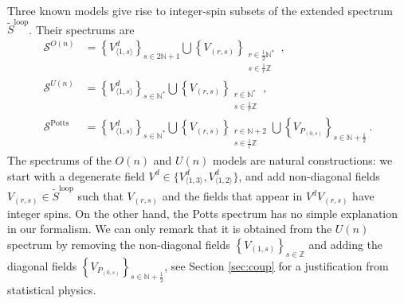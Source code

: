 \documentclass[12pt, a4paper]{article}
\theoremstyle{break}
\begin{document}
Three known models give rise to integer-spin subsets of the extended spectrum $\widetilde{S}^\text{loop}$. 
Their spectrums are 
\begin{align}
\mathcal{S}^{O(n)} &= \left\{V^d_{\langle 1,s\rangle}\right\}_{s\in 2\mathbb{N}+1} \bigcup \left\{V_{(r,s)}\right\}_{\substack{r\in \frac12\mathbb{N}^*\\ s\in\frac{1}{r}\mathbb{Z}}}  \ ,
\label{son}
 \\
 \mathcal{S}^{U(n)} &= \left\{V^d_{\langle 1,s\rangle}\right\}_{s\in\mathbb{N}^*} \bigcup \left\{V_{(r,s)}\right\}_{\substack{r\in \mathbb{N}^*\\ s\in\frac{1}{r}\mathbb{Z}}}  \ ,
 \label{sun}
 \\
 \mathcal{S}^\text{Potts} &= \left\{V^d_{\langle 1,s\rangle}\right\}_{s\in\mathbb{N}^*} \bigcup \left\{V_{(r,s)}\right\}_{\substack{r\in \mathbb{N}+2\\ s\in\frac{1}{r}\mathbb{Z}}} \bigcup  \left\{ V_{P_{(0,s)}}\right\}_{s\in \mathbb{N}+\frac12}\ .
 \label{spotts}
\end{align}
The spectrums of the $O(n)$ and $U(n)$ models are natural constructions: we start with a degenerate field $V^d\in\{V^d_{\langle 1,3\rangle},V^d_{\langle 1,2\rangle}\}$, and add non-diagonal fields $V_{(r,s)}\in\widetilde{S}^\text{loop}$ such that $V_{(r,s)}$ and the fields that appear in $V^dV_{(r,s)}$ have integer spins. 
On the other hand, the Potts spectrum has no simple explanation in our formalism. We can only remark that it is obtained from the $U(n)$ spectrum by removing the non-diagonal fields $\left\{V_{(1,s)}\right\}_{s\in\mathbb{Z}}$ and adding the diagonal fields $\left\{ V_{P_{(0,s)}}\right\}_{s\in \mathbb{N}+\frac12}$, see Section \ref{sec:coup} for a justification from statistical physics.  
\end{document}
